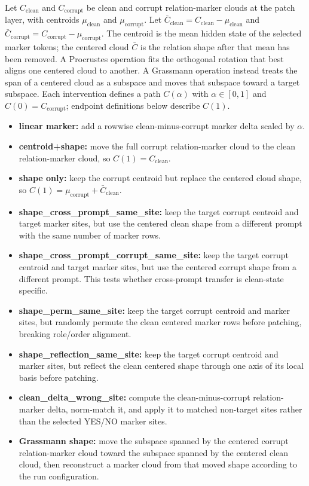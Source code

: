 \documentclass[11pt]{article}
\newcommand{\clean}{\mathrm{clean}}
\newcommand{\corr}{\mathrm{corrupt}}
\begin{document}
Let $C_{\clean}$ and $C_{\corr}$ be clean and corrupt relation-marker clouds at the patch layer, with centroids $\mu_{\clean}$ and $\mu_{\corr}$. Let $\bar C_{\clean}=C_{\clean}-\mu_{\clean}$ and $\bar C_{\corr}=C_{\corr}-\mu_{\corr}$. The centroid is the mean hidden state of the selected marker tokens; the centered cloud $\bar C$ is the relation shape after that mean has been removed. A Procrustes operation fits the orthogonal rotation that best aligns one centered cloud to another. A Grassmann operation instead treats the span of a centered cloud as a subspace and moves that subspace toward a target subspace. Each intervention defines a path $C(\alpha)$ with $\alpha\in[0,1]$ and $C(0)=C_{\corr}$; endpoint definitions below describe $C(1)$.

\begin{itemize}
\item \textbf{linear marker:} add a rowwise clean-minus-corrupt marker delta scaled by $\alpha$.
\item \textbf{centroid+shape:} move the full corrupt relation-marker cloud to the clean relation-marker cloud, so $C(1)=C_{\clean}$.
\item \textbf{shape only:} keep the corrupt centroid but replace the centered cloud shape, so $C(1)=\mu_{\corr}+\bar C_{\clean}$.
\item \textbf{shape\_cross\_prompt\_same\_site:} keep the target corrupt centroid and target marker sites, but use the centered clean shape from a different prompt with the same number of marker rows.
\item \textbf{shape\_cross\_prompt\_corrupt\_same\_site:} keep the target corrupt centroid and target marker sites, but use the centered corrupt shape from a different prompt. This tests whether cross-prompt transfer is clean-state specific.
\item \textbf{shape\_perm\_same\_site:} keep the target corrupt centroid and marker sites, but randomly permute the clean centered marker rows before patching, breaking role/order alignment.
\item \textbf{shape\_reflection\_same\_site:} keep the target corrupt centroid and marker sites, but reflect the clean centered shape through one axis of its local basis before patching.
\item \textbf{clean\_delta\_wrong\_site:} compute the clean-minus-corrupt relation-marker delta, norm-match it, and apply it to matched non-target sites rather than the selected YES/NO marker sites.
\item \textbf{Grassmann shape:} move the subspace spanned by the centered corrupt relation-marker cloud toward the subspace spanned by the centered clean cloud, then reconstruct a marker cloud from that moved shape according to the run configuration.

\end{itemize}
\end{document}

